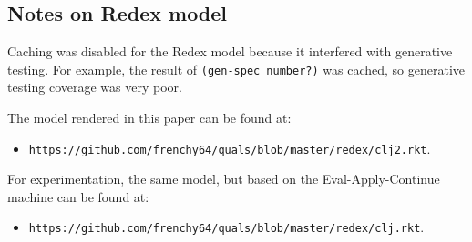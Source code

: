 \subsection{Notes on Redex model}

Caching was disabled for the Redex model because it interfered with generative testing.
For example, the result of \texttt{(gen-spec number?)} was cached, so generative testing coverage
was very poor.

The model rendered in this paper can be found at:
\begin{itemize}
\item \texttt{https://github.com/frenchy64/quals/blob/master/redex/clj2.rkt}.
\end{itemize}

For experimentation, the same model, but based on the Eval-Apply-Continue machine
can be found at:
\begin{itemize}
\item
 \texttt{https://github.com/frenchy64/quals/blob/master/redex/clj.rkt}.
\end{itemize}

